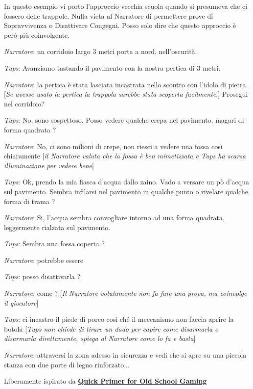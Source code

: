 \begin{changemargin}{0.3cm}{0.3cm}\begin{tcolorbox}[title = Tups e la trappola]{\small
In questo esempio vi porto l'approccio vecchia scuola quando si presumeva che ci fossero delle trappole. Nulla vieta al Narratore di permettere prove di Sopravvivenza o Disattivare Congegni. Posso solo dire che questo approccio è però più coinvolgente.

\bigskip

\emph{Narratore}: un corridoio largo 3 metri porta a nord, nell'oscurità.

\emph{Tups}: Avanziamo tastando il pavimento con la nostra pertica di 3 metri.

\emph{Narratore}: la pertica è stata lasciata incastrata nello scontro con l'idolo di pietra.
[\emph{Se avesse usato la pertica la trappola sarebbe stata scoperta facilmente}.]
Prosegui nel corridoio?

\emph{Tups}: No, sono sospettoso. Posso vedere qualche crepa nel pavimento, magari di forma quadrata ?

\emph{Narratore}: No, ci sono milioni di crepe, non riesci a vedere una fossa così chiaramente [\emph{il Narratore valuta che la fossa è ben mimetizzata e Tups ha scarsa illuminazione per vedere bene}]

\emph{Tups}: Ok, prendo la mia fiasca d'acqua dallo zaino. Vado a versare un pò d'acqua sul pavimento. Sembra infilarsi nel pavimento in qualche punto o rivelare qualche forma di trama ?

\emph{Narratore}: Si, l'acqua sembra convogliare intorno ad una forma quadrata, leggermente rialzata sul pavimento.

\emph{Tups}: Sembra una fossa coperta ?

\emph{Narratore}: potrebbe essere

\emph{Tups}: posso disattivarla ?

\emph{Narratore}: come ? [\emph{Il Narratore volutamente non fa fare una prova, ma coinvolge il giocatore}]

\emph{Tups}: ci incastro il piede di porco così ché il meccanismo non faccia aprire la botola [\emph{Tups non chiede di tirare un dado per capire come disarmarla o disarmarla direttamente, spiega al Narratore come lo fa e basta}]

\emph{Narratore}: attraversi la zona adesso in sicurezza e vedi che si apre su una piccola stanza con due porte di legno rinforzato... }

\medskip

Liberamente ispirato da \href{https://friendorfoe.com/d/Old%20School%20Primer.pdf}{ \textbf{Quick Primer for Old School Gaming}}

\end{tcolorbox}\end{changemargin}

